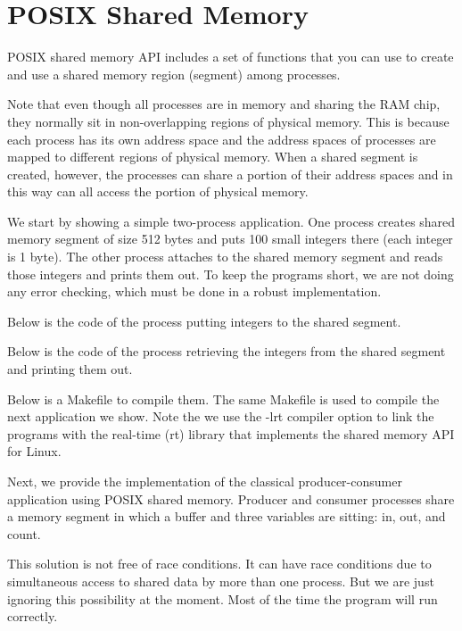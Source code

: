 \section{POSIX Shared Memory}

POSIX shared memory API includes a set of functions that you can use
to create and use a shared memory region (segment) among processes.

Note that even though all processes are in memory and sharing the RAM
chip, they normally sit in non-overlapping regions of physical
memory. This is because each process has its own address space and the
address spaces of processes are mapped to different regions of
physical memory. When a shared segment is created, however, the
processes can share a portion of their address spaces and in this way
can all access the portion of physical memory.

We start by showing a simple two-process application. One process
creates shared memory segment of size 512 bytes and puts 100 small
integers there (each integer is 1 byte). The other process attaches to
the shared memory segment and reads those integers and prints them
out. To keep the programs short, we are not doing any error checking,
which must be done in a robust implementation.

Below is the code of the process putting integers to the shared
segment.


Below is the code of the process retrieving the integers from the
shared segment and printing them out.


Below is a Makefile to compile them. The same Makefile is used to
compile the next application we show. Note the we use the -lrt
compiler option to link the programs with the real-time (rt) library
that implements the shared memory API for Linux.


Next, we provide the implementation of the classical producer-consumer
application using POSIX shared memory.  Producer and consumer
processes share a memory segment in which a buffer and three variables
are sitting: in, out, and count.

This solution is not free of race conditions. It can have race
conditions due to simultaneous access to shared data by more than one
process. But we are just ignoring this possibility at the moment. Most
of the time the program will run correctly.

